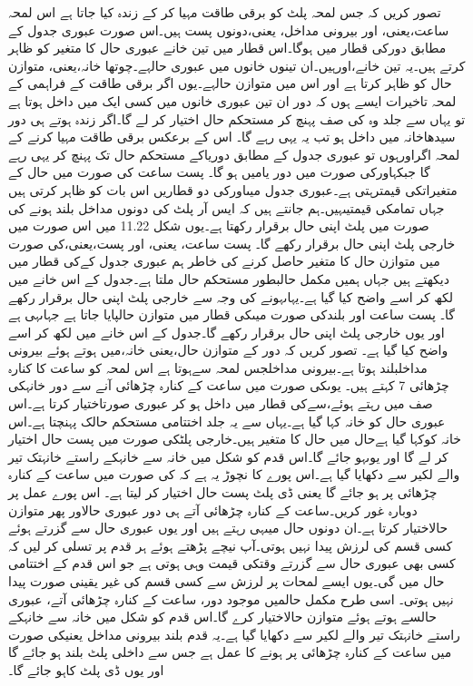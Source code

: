 	تصور کریں کہ جس لمحہ پلٹ کو برقی طاقت مہیا کر کے زندہ کیا جاتا ہے  اس لمحہ  ساعت،یعنی، اور بیرونی مداخل، یعنی،دونوں پست ہیں۔اس صورت عبوری جدول کے مطابق دورکی قطار میں ہوگا۔اس قطار میں تین خانے عبوری حال کا متغیر کو ظاہر کرتے ہیں۔یہ تین خانے،اورہیں۔ان تینوں خانوں میں عبوری حالہے۔چوتھا خانہ،یعنی، متوازن حال کو ظاہر کرتا ہے اور اس میں متوازن حالہے۔یوں اگر برقی طاقت کے فراہمی کے لمحہ تاخیرات ایسے ہوں کہ دور ان تین عبوری خانوں میں کسی ایک میں داخل ہوتا ہے تو یہاں سے جلد وہ کی صف پہنچ کر مستحکم حال اختیار کر لے گا۔اگر زندہ ہوتے ہی دور سیدھاخانہ میں داخل ہو تب یہ یہی رہے گا۔
	اس کے برعکس برقی طاقت مہیا کرنے کے لمحہ اگراورہوں تو عبوری جدول کے مطابق دوریاکے مستحکم حال تک پہنچ کر یہی رہے گا جبکہاورکی صورت میں دور یامیں ہو گا۔
	پست ساعت کی صورت میں حال کے متغیراتکی قیمترہتی ہے۔عبوری جدول میںاورکی دو قطاریں اس بات کو ظاہر کرتی ہیں جہاں تمامکی قیمتیںہیں۔ہم جانتے ہیں کہ ایس آر پلٹ کی دونوں مداخل بلند ہونے کی صورت میں پلٹ اپنی حال برقرار رکھتا ہے۔یوں شکل 11.22 میں اس صورت میں خارجی پلٹ اپنی حال برقرار رکھے گا۔
	پست ساعت، یعنی، اور پست،یعنی،کی صورت میں متوازن حال کا متغیر حاصل کرنے کی خاطر ہم عبوری جدول کےکی قطار میں دیکھتے ہیں جہاں ہمیں مکمل حالبطور مستحکم حال ملتا ہے۔جدول کے اس خانے میں لکھ کر اسے واضح کیا گیا ہے۔یہاںہونے کی وجہ سے خارجی پلٹ اپنی حال برقرار رکھے گا۔
	پست ساعت اور بلندکی صورت میںکی قطار میں متوازن حالپایا جاتا ہے جہاںہی ہے اور یوں خارجی پلٹ اپنی حال برقرار رکھے گا۔جدول کے اس خانے میں لکھ کر اسے واضح کیا گیا ہے۔
	تصور کریں کہ دور کے متوازن حال،یعنی خانہ،میں ہوتے ہوئے بیرونی مداخلبلند ہوتا ہے۔بیرونی مداخلجس لمحہ سےہوتا ہے اس لمحہ کو ساعت کا کنارہ چڑھائی 7 کہتے ہیں۔ یوںکی صورت میں ساعت کے کنارہ چڑھائی آنے سے دور خانہکی صف میں رہتے ہوئے،سےکی قطار میں داخل ہو کر عبوری صورتاختیار کرتا ہے۔اس عبوری حال کو خانہ کہا گیا ہے۔یہاں سے یہ جلد اختتامی مستحکم حالک پہنچتا ہے۔اس خانہ کوکہا گیا ہےحال میں حال کا متغیر ہیں۔خارجی پلٹکی صورت میں پست حال اختیار کر لے گا اور یوںہو جائے گا۔اس قدم کو شکل میں خانہ سے  خانہکے راستے خانہتک تیر والے لکیر سے دکھایا گیا ہے۔اس پورے کا نچوڑ یہ ہے کہ کی صورت میں ساعت کے کنارہ چڑھائی پر ہو جائے گا یعنی ڈی پلٹ پست حال اختیار کر لیتا ہے۔
	اس پورے عمل پر دوبارہ غور کریں۔ساعت کے کنارہ چڑھائی آتے ہی دور عبوری حالاور پھر متوازن حالاختیار کرتا ہے۔ان دونوں حال میںہی رہتے ہیں اور یوں عبوری حال سے گزرتے ہوئے کسی قسم کی لرزش پیدا نہیں ہوتی۔آپ نیچے پڑھتے ہوئے ہر قدم پر تسلی کر لیں کہ کسی بھی عبوری حال سے گزرتے وقتکی قیمت وہی ہوتی ہے جو اس قدم کے اختتامی حال میں گی۔یوں ایسے لمحات پر لرزش سے کسی قسم کی غیر یقینی صورت پیدا نہیں ہوتی۔
		اسی طرح مکمل حالمیں موجود دور، ساعت کے کنارہ چڑھائی آتے، عبوری حالسے ہوتے ہوئے متوازن حالاختیار کرے گا۔اس قدم کو شکل میں خانہ سے  خانہکے راستے خانہتک تیر والے لکیر سے دکھایا گیا ہے۔یہ قدم بلند بیرونی مداخل یعنیکی صورت میں ساعت کے کنارہ چڑھائی پر ہونے کا عمل ہے جس سے داخلی پلٹ بلند ہو جائے گا اور یوں ڈی پلٹ کاہو جائے گا۔
